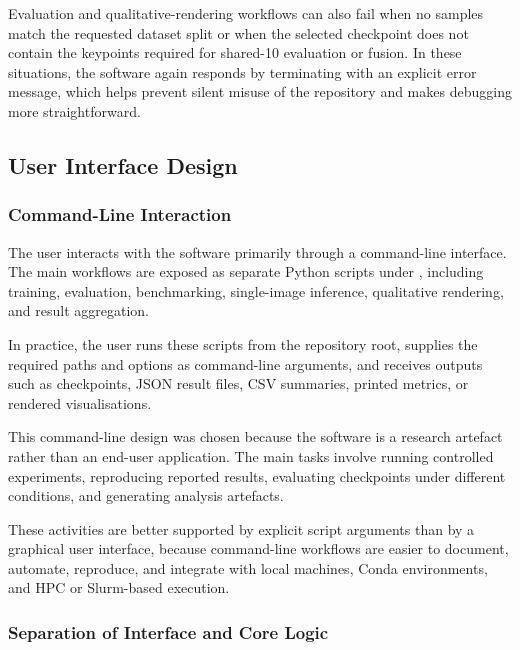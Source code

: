 ﻿\documentclass[11pt,a4paper]{article}
\begin{document}
\medskip

Evaluation and qualitative-rendering workflows can also fail when no samples
match the requested dataset split or when the selected checkpoint does not
contain the keypoints required for shared-10 evaluation or fusion. In these
situations, the software again responds by terminating with an explicit error
message, which helps prevent silent misuse of the repository and makes
debugging more straightforward.

\subsection{User Interface Design}

\subsubsection*{Command-Line Interaction}

The user interacts with the software primarily through a command-line
interface. The main workflows are exposed as separate Python scripts under
, including training, evaluation, benchmarking,
single-image inference, qualitative rendering, and result aggregation.

\medskip

In practice, the user runs these scripts from the repository root, supplies
the required paths and options as command-line arguments, and receives outputs
such as checkpoints, JSON result files, CSV summaries, printed metrics, or
rendered visualisations.

\medskip

This command-line design was chosen because the software is a research
artefact rather than an end-user application. The main tasks involve running
controlled experiments, reproducing reported results, evaluating checkpoints
under different conditions, and generating analysis artefacts.

\medskip

These activities are better supported by explicit script arguments than by a
graphical user interface, because command-line workflows are easier to
document, automate, reproduce, and integrate with local machines, Conda
environments, and HPC or Slurm-based execution.

\subsubsection*{Separation of Interface and Core Logic}
\end{document}
